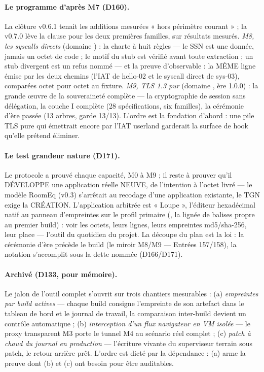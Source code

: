 \paragraph{Le programme d'après M7 (D160).} La clôture v0.6.1 tenait les additions
mesurées « hors périmètre courant » ; la v0.7.0 lève la clause pour les deux
premières familles, sur résultats mesurés. \emph{M8, les syscalls directs} (domaine
) : la charte à huit règles — le SSN est une donnée, jamais un octet de
code ; le motif du stub est vérifié avant toute extraction ; un stub divergent est
un refus nommé — et la preuve d'observable : la MÊME ligne émise par les deux
chemins (l'IAT  de hello-02 et le syscall direct 
de sys-03), comparées octet pour octet au fixture. \emph{M9, TLS 1.3 pur} (domaine
, ère 1.0.0) : la grande œuvre de la souveraineté complète — la
cryptographie de session sans délégation, la couche I complète (28 spécifications,
six familles), la cérémonie d'ère passée (13 arbres, garde 13/13). L'ordre est la
fondation d'abord : une pile TLS pure qui émettrait encore par l'IAT userland
garderait la surface de hook qu'elle prétend éliminer.

\paragraph{Le test grandeur nature (D171).} Le protocole a prouvé chaque capacité,
M0 à M9 ; il reste à prouver qu'il DÉVELOPPE une application réelle NEUVE, de
l'intention à l'octet livré — le modèle RoomEq (v0.3) s'arrêtait au recodage d'une
application existante, le TGN exige la CRÉATION. L'application arbitrée est
« Loupe », l'éditeur hexadécimal natif au panneau d'empreintes sur le profil
primaire (, la lignée de balises propre  au
premier build) : voir les octets, leurs lignes, leurs empreintes md5/sha-256, leur
place — l'outil du quotidien du projet. La découpe du plan est la loi : la cérémonie
d'ère précède le build (le miroir M8/M9 — Entrées 157/158), la notation s'accomplit
sous la dette nommée (D166/D171).

\paragraph{Archivé (D133, pour mémoire).} Le jalon de l'outil complet s'ouvrit sur trois
chantiers mesurables : (a) \emph{empreintes par build actives} — chaque build consigne
l'empreinte de son artefact dans le tableau de bord et le journal de travail, la
comparaison inter-build devient un contrôle automatique ; (b) \emph{interception d'un
flux navigateur en VM isolée} — le proxy transparent M3 porte le tunnel M4 au scénario
réel complet ; (c) \emph{patch à chaud du journal en production} — l'écriture vivante
du superviseur terrain sous patch, le retour arrière prêt. L'ordre est dicté par la
dépendance : (a) arme la preuve dont (b) et (c) ont besoin pour être auditables.

